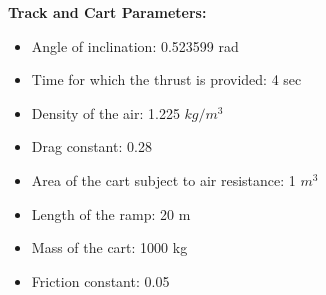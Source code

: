 \documentclass{article}
\begin{document}
    \textbf{Track and Cart Parameters:}
    \begin{itemize}
        \item Angle of inclination: 0.523599 rad

        \item Time for which the thrust is provided: 4 sec

        \item Density of the air: 1.225 $kg/m^{3}$

        \item Drag constant: 0.28

        \item Area of the cart subject to air resistance: 1 $m^{3}$

        \item Length of the ramp: 20 m

        \item Mass of the cart: 1000 kg

        \item Friction constant: 0.05
    \end{itemize}
\end{document}
